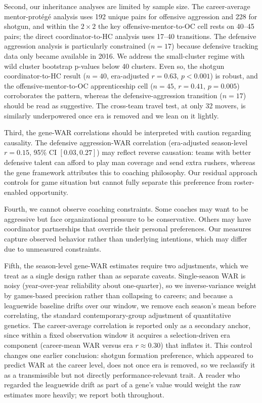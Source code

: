 \documentclass[USenglish]{article}
\theoremstyle{dgthm}
\theoremstyle{dgdef}
\begin{document}
Second, our inheritance analyses are limited by sample size. The career-average mentor-prot\'{e}g\'{e} analysis uses 192 unique pairs for offensive aggression and 228 for shotgun, and within the $2\times2$ the key offensive-mentor-to-OC cell rests on 40--45 pairs; the direct coordinator-to-HC analysis uses 17--40 transitions. The defensive aggression analysis is particularly constrained ($n=17$) because defensive tracking data only became available in 2016. We address the small-cluster regime with wild cluster bootstrap p-values below 40 clusters. Even so, the shotgun coordinator-to-HC result ($n=40$, era-adjusted $r=0.63$, $p<0.001$) is robust, and the offensive-mentor-to-OC apprenticeship cell ($n=45$, $r=0.41$, $p=0.005$) corroborates the pattern, whereas the defensive-aggression transition ($n=17$) should be read as suggestive. The cross-team travel test, at only 32 movers, is similarly underpowered once era is removed and we lean on it lightly.

Third, the gene-WAR correlations should be interpreted with caution regarding causality. The defensive aggression-WAR correlation (era-adjusted season-level $r=0.15$, 95\% CI $[0.03, 0.27]$) may reflect reverse causation: teams with better defensive talent can afford to play man coverage and send extra rushers, whereas the gene framework attributes this to coaching philosophy. Our residual approach controls for game situation but cannot fully separate this preference from roster-enabled opportunity.

Fourth, we cannot observe coaching constraints. Some coaches may want to be aggressive but face organizational pressure to be conservative. Others may have coordinator partnerships that override their personal preferences. Our measures capture observed behavior rather than underlying intentions, which may differ due to unmeasured constraints.

Fifth, the season-level gene-WAR estimates require two adjustments, which we treat as a single design rather than as separate caveats. Single-season WAR is noisy (year-over-year reliability about one-quarter), so we inverse-variance weight by games-based precision rather than collapsing to careers; and because a leaguewide baseline drifts over our window, we remove each season's mean before correlating, the standard contemporary-group adjustment of quantitative genetics. The career-average correlation is reported only as a secondary anchor, since within a fixed observation window it acquires a selection-driven era component (career-mean WAR versus era $r\approx0.30$) that inflates it. This control changes one earlier conclusion: shotgun formation preference, which appeared to predict WAR at the career level, does not once era is removed, so we reclassify it as a transmissible but not directly performance-relevant trait. A reader who regarded the leaguewide drift as part of a gene's value would weight the raw estimates more heavily; we report both throughout.
\end{document}
